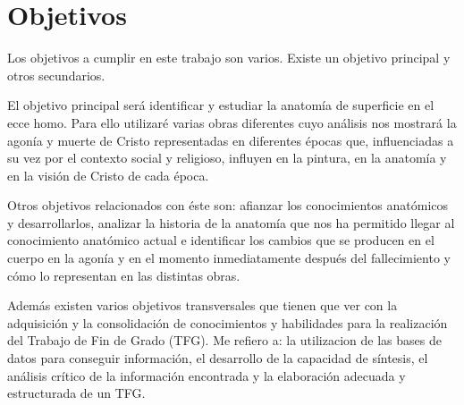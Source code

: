 \section{Objetivos}
Los objetivos a cumplir en este trabajo son varios. Existe un objetivo principal y otros secundarios.

El objetivo principal será identificar y estudiar la anatomía de superficie en el ecce homo. Para ello utilizaré varias obras diferentes cuyo análisis nos mostrará la agonía y muerte de Cristo representadas en diferentes épocas que, influenciadas a su vez por el contexto social y religioso, influyen en la pintura, en la anatomía y en la visión de Cristo de cada época.

Otros objetivos relacionados con éste son: afianzar los conocimientos anatómicos y desarrollarlos, analizar la historia de la anatomía que nos ha permitido llegar al conocimiento anatómico actual e identificar los cambios que se producen en el cuerpo en la agonía y en el momento inmediatamente después del fallecimiento y cómo lo representan en las distintas obras.

Además existen varios objetivos transversales que tienen que ver con la adquisición y la consolidación de conocimientos y habilidades para la realización del Trabajo de Fin de Grado (TFG). Me refiero a: la utilizacion de las bases de datos para conseguir información, el desarrollo de la capacidad de síntesis, el análisis crítico de la información encontrada y la elaboración adecuada y estructurada de un TFG.